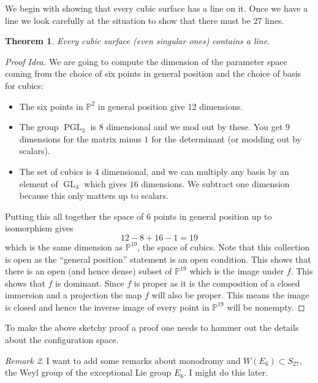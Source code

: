 \documentclass[12pt]{article}
\numberwithin{equation}{section}
\newtheorem{theorem}{Theorem}[subsection]
\theoremstyle{definition}
\theoremstyle{remark}
\newtheorem{remark}[theorem]{Remark}
\newcommand{\PP}{\mathbb{P}}
\newcommand{\GL}{\operatorname{GL}}
\newcommand{\PGL}{\operatorname{PGL}}
\begin{document}
We begin with showing that every cubic surface has a line on it. 
Once we have a line we look carefully at the situation to show that there must be 27 lines.
\begin{theorem}
	Every cubic surface (even singular ones) contains a line. 
\end{theorem}
\begin{proof}[Proof Idea]
We are going to compute the dimension of the parameter space coming from the choice of six points in general position and the choice of basis for cubics:
	\begin{itemize} 
		\item The six points in $\PP^2$ in general position give 12 dimensions. 
		\item The group $\PGL_3$ is 8 dimensional and we mod out by these. You get $9$ dimensions for the matrix minus $1$ for the determinant (or modding out by scalars). 
		\item The set of cubics is $4$ dimensional, and we can multiply any basis by an element of $\GL_4$ which gives $16$ dimensions. We subtract one dimension because this only matters up to scalars. 
	\end{itemize}
	Putting this all together the space of 6 points in general position up to isomorphism gives 
	$$ 12-8+16-1 = 19 $$
	which is the same dimension as $\PP^{19}$, the space of cubics. 
	Note that this collection is open as the ``general position'' statement is an open condition.
	This shows that there is an open (and hence dense) subset of $\PP^{19}$ which is the image under $f$. 
	This shows that $f$ is dominant. 
	Since $f$ is proper as it is the composition of a closed immersion and a projection the map $f$ will also be proper. 
	This means the image is closed and hence the inverse image of every point in $\PP^{19}$ will be nonempty. 
\end{proof}
To make the above sketchy proof a proof one needs to hammer out the details about the configuration space. 
\begin{remark}
I want to add some remarks about monodromy and $W(E_6) \subset S_{27}$, the Weyl group of the exceptional Lie group $E_6$. I might do this later. 
\end{remark}
\end{document}
